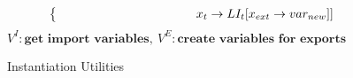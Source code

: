 \begin{figure*}[tbp]
\begin{mdframed}
\begin{align*}
\begin{cases*}
          \;        &\; \hspace{3.2cm} $x_t\rightarrow LI_t[x_{ext}\rightarrow var_{new}]]$
      \end{cases*} \\
    \end{align*}
    \hfill \footnotesize $\mathit{V}^I : \textbf{get  import variables},\: \mathit{V}^E : \textbf{create variables for exports}$
    \caption{Instantiation Utilities}
    \label{fig:inst-utils}
  \end{mdframed}
\end{figure*}


